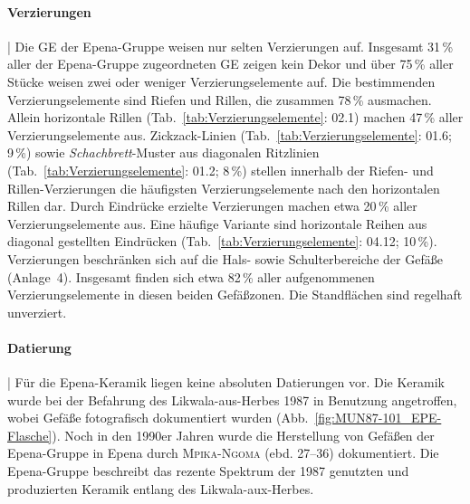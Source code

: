 \paragraph{Verzierungen}\hspace{-.5em}|\hspace{.5em}%
Die GE der Epena-Gruppe weisen nur selten Verzierungen auf. Insgesamt 31\,\% aller der Epena-Gruppe zugeordneten GE zeigen kein Dekor und über 75\,\% aller Stücke weisen zwei oder weniger Verzierungselemente auf. Die bestimmenden Verzierungselemente sind Riefen und Rillen, die zusammen 78\,\% ausmachen. Allein horizontale Rillen (Tab.~\ref{tab:Verzierungselemente}: 02.1) machen 47\,\% aller Verzierungselemente aus. Zickzack-Linien (Tab.~\ref{tab:Verzierungselemente}: 01.6; 9\,\%) sowie \textit{Schachbrett}-Muster aus diagonalen Ritzlinien (Tab.~\ref{tab:Verzierungselemente}: 01.2; 8\,\%) stellen innerhalb der Riefen- und Rillen-Verzierungen die häufigsten Verzierungselemente nach den horizontalen Rillen dar. Durch Eindrücke erzielte Verzierungen machen etwa 20\,\% aller Verzierungselemente aus. Eine häufige Variante sind horizontale Reihen aus diagonal gestellten Eindrücken (Tab.~\ref{tab:Verzierungselemente}: 04.12; 10\,\%). Verzierungen beschränken sich auf die Hals- sowie Schulterbereiche der Gefäße (Anlage~4). Insgesamt finden sich etwa 82\,\% aller aufgenommenen Verzierungselemente in diesen beiden Gefäßzonen. Die Standflächen sind regelhaft unverziert.

\paragraph{Datierung}\hspace{-.5em}|\hspace{.5em}%
Für die Epena-Keramik liegen keine absoluten Datierungen vor. Die Keramik wurde bei der Befahrung des Likwala-aus-Herbes 1987 in Benutzung angetroffen, wobei Gefäße fotografisch dokumentiert wurden (Abb.~\ref*{fig:MUN87-101_EPE-Flasche}). Noch in den 1990er Jahren wurde die Herstellung von Gefäßen der Epena-Gruppe in Epena durch \textsc{Mpika-Ngoma} (ebd. 27--36) dokumentiert. Die Epena-Gruppe beschreibt das rezente Spektrum der 1987 genutzten und produzierten Keramik entlang des Likwala-aux-Herbes.

